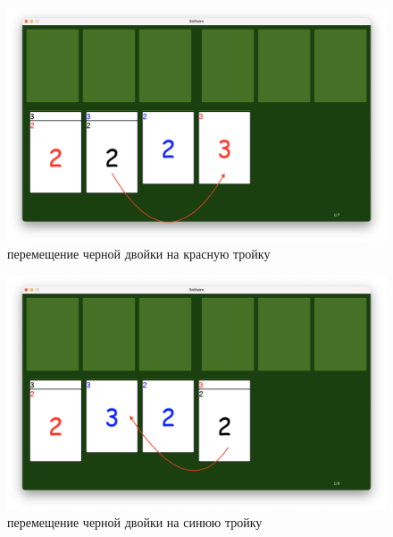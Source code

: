 \documentclass[12pt]{report}
\begin{document}
\begin{figure}[H]
    	\begin{center}
    		\includegraphics[scale=0.25]{problem_4.png}
    		\caption{перемещение черной двойки на красную тройку}
    	\end{center}
\end{figure}
\begin{figure}[H]
    	\begin{center}
    		\includegraphics[scale=0.25]{problem_3.png}
    		\caption{перемещение черной двойки на синюю тройку}
    	\end{center}
\end{figure}
\end{document}
